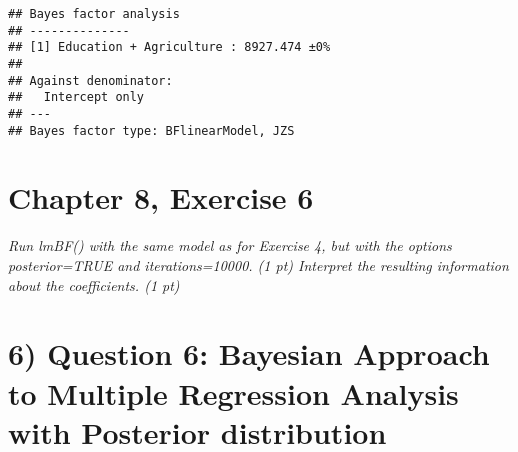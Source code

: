 \documentclass[]{article}
\begin{document}
\begin{verbatim}
## Bayes factor analysis
## --------------
## [1] Education + Agriculture : 8927.474 ±0%
## 
## Against denominator:
##   Intercept only 
## ---
## Bayes factor type: BFlinearModel, JZS
\end{verbatim}

\hypertarget{chapter-8-exercise-6}{%
\section{Chapter 8, Exercise 6}\label{chapter-8-exercise-6}}

\emph{Run lmBF() with the same model as for Exercise 4, but with the
options posterior=TRUE and iterations=10000. (1 pt) Interpret the
resulting information about the coefficients. (1 pt)}

\hypertarget{question-6-bayesian-approach-to-multiple-regression-analysis-with-posterior-distribution}{%
\section{6) Question 6: Bayesian Approach to Multiple Regression
Analysis with Posterior
distribution}\label{question-6-bayesian-approach-to-multiple-regression-analysis-with-posterior-distribution}}
\end{document}
